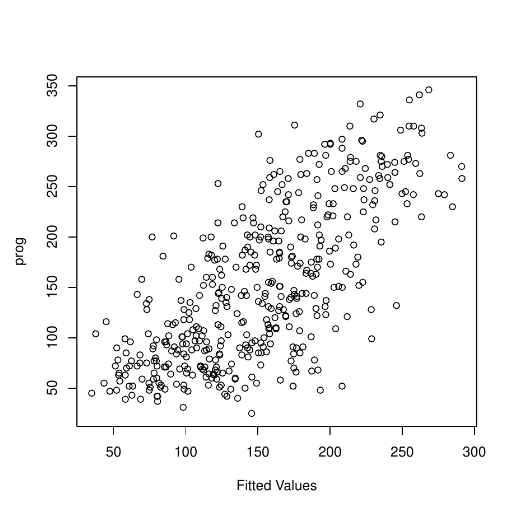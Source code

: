 \documentclass{article}
\begin{document}
\includegraphics{RProject1_IntroToR_Diabetes-004}
\end{document}
